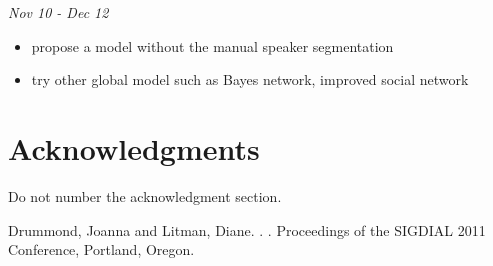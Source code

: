 \documentclass[11pt,letterpaper]{article}
\begin{document}
\noindent \emph{Nov 10 - Dec 12}
\begin{itemize}
  \item propose a model without the manual speaker segmentation
  \item try other global model such as Bayes network, improved social network
\end{itemize}

\section*{Acknowledgments}

Do not number the acknowledgment section.

\begin{thebibliography}{}
Drummond, Joanna and Litman, Diane.
.
.
\newblock Proceedings of the SIGDIAL 2011 Conference, Portland, Oregon.

\end{thebibliography}
\end{document}
